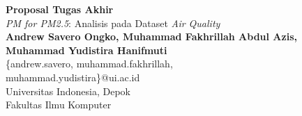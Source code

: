 \documentclass{article}
\begin{document}
	\begin{center}
    
    
		\LARGE{\textbf{Proposal Tugas Akhir}} \\
        \vspace{1em}
        \Large{\textit{PM for PM2.5}: Analisis pada Dataset \textit{Air Quality}} \\
        \vspace{1em}
        \normalsize\textbf{Andrew Savero Ongko, Muhammad Fakhrillah Abdul Azis,} \\
        \normalsize\textbf{Muhammad Yudistira Hanifmuti} \\
        \normalsize{\{andrew.savero, muhammad.fakhrillah, } \\
        \normalsize{muhammad.yudistira\}@ui.ac.id} \\
        \vspace{1em}
        \normalsize{Universitas Indonesia, Depok} \\
        \normalsize{Fakultas Ilmu Komputer}
     
	\end{center}
\end{document}

